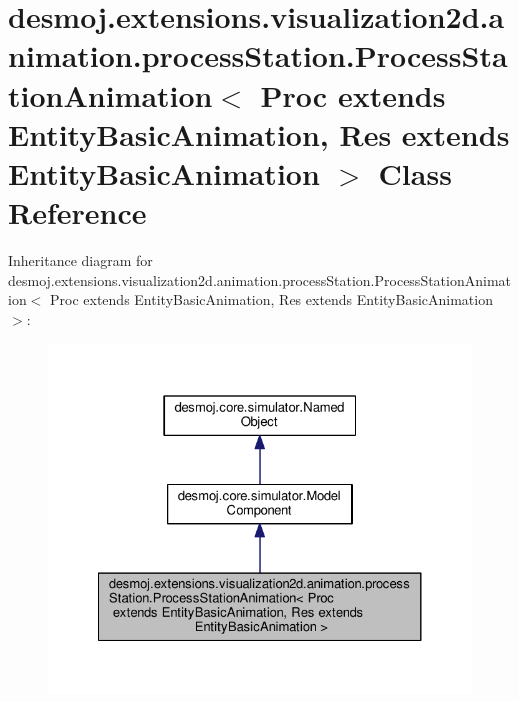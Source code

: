 \section{desmoj.\-extensions.\-visualization2d.\-animation.\-process\-Station.\-Process\-Station\-Animation$<$ Proc extends Entity\-Basic\-Animation, Res extends Entity\-Basic\-Animation $>$ Class Reference}
\label{classdesmoj_1_1extensions_1_1visualization2d_1_1animation_1_1process_station_1_1_process_station01c90feb9364485e8a04174ac7418212}


Inheritance diagram for desmoj.\-extensions.\-visualization2d.\-animation.\-process\-Station.\-Process\-Station\-Animation$<$ Proc extends Entity\-Basic\-Animation, Res extends Entity\-Basic\-Animation $>$\-:
\nopagebreak
\begin{figure}[H]
\begin{center}
\leavevmode
\includegraphics[width=326pt]{classdesmoj_1_1extensions_1_1visualization2d_1_1animation_1_1process_station_1_1_process_station77f8c8dca4eab2758f165188abe60d49}
\end{center}
\end{figure}


